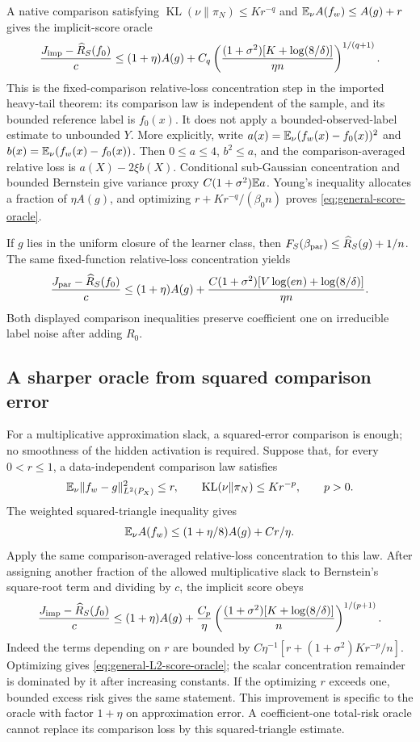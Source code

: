 A native comparison satisfying $\operatorname{KL}(\nu\|\pi_N)\le K r^{-q}$ and $\mathbb E_\nu A(f_w)\le A(g)+r$ gives the implicit-score oracle
\begin{equation}
 \frac{J_{\rm imp}-\widehat R_S(f_0)}c
 \le(1+\eta)A(g)+
 C_q\left(\frac{(1+\sigma^2)[K+\log(8/\delta)]}{\eta n}\right)^{1/(q+1)}.
 \label{eq:general-score-oracle}
\end{equation}
This is the fixed-comparison relative-loss concentration step in the imported heavy-tail theorem: its comparison law is independent of the sample, and its bounded reference label is $f_0(x)$. It does not apply a bounded-observed-label estimate to unbounded $Y$. More explicitly, write $a(x)=\mathbb E_\nu(f_w(x)-f_0(x))^2$ and $b(x)=\mathbb E_\nu(f_w(x)-f_0(x))$. Then $0\le a\le4$, $b^2\le a$, and the comparison-averaged relative loss is $a(X)-2\xi b(X)$. Conditional sub-Gaussian concentration and bounded Bernstein give variance proxy $C(1+\sigma^2)\mathbb E a$. Young's inequality allocates a fraction of $\eta A(g)$, and optimizing $r+K r^{-q}/(\beta_0n)$ proves \eqref{eq:general-score-oracle}.

If $g$ lies in the uniform closure of the learner class, then $F_S(\beta_{\rm par})\le\widehat R_S(g)+1/n$. The same fixed-function relative-loss concentration yields
\begin{equation}
 \frac{J_{\rm par}-\widehat R_S(f_0)}c
 \le(1+\eta)A(g)+
 \frac{C(1+\sigma^2)[V\log(en)+\log(8/\delta)]}{\eta n}.
 \label{eq:general-parameter-oracle}
\end{equation}
Both displayed comparison inequalities preserve coefficient one on irreducible label noise after adding $R_0$.

\subsection{A sharper oracle from squared comparison error}
For a multiplicative approximation slack, a squared-error comparison is enough; no smoothness of the hidden activation is required. Suppose that, for every $0<r\le1$, a data-independent comparison law satisfies
\[
 \mathbb E_\nu\|f_w-g\|_{L^2(P_X)}^2\le r,
 \qquad \operatorname{KL}(\nu\|\pi_N)\le K r^{-p},\qquad p>0.
\]
The weighted squared-triangle inequality gives
\[
 \mathbb E_\nu A(f_w)\le(1+\eta/8)A(g)+C r/\eta.
\]
Apply the same comparison-averaged relative-loss concentration to this law. After assigning another fraction of the allowed multiplicative slack to Bernstein's square-root term and dividing by $c$, the implicit score obeys
\begin{equation}
 \frac{J_{\rm imp}-\widehat R_S(f_0)}c
 \le(1+\eta)A(g)+\frac{C_p}{\eta}
       \left(\frac{(1+\sigma^2)[K+\log(8/\delta)]}{n}
       \right)^{1/(p+1)}.
 \label{eq:general-L2-score-oracle}
\end{equation}
Indeed the terms depending on $r$ are bounded by
$C\eta^{-1}[r+(1+\sigma^2)K r^{-p}/n]$.
Optimizing gives \eqref{eq:general-L2-score-oracle}; the scalar concentration remainder is dominated by it after increasing constants. If the optimizing $r$ exceeds one, bounded excess risk gives the same statement. This improvement is specific to the oracle with factor $1+\eta$ on approximation error. A coefficient-one total-risk oracle cannot replace its comparison loss by this squared-triangle estimate.
